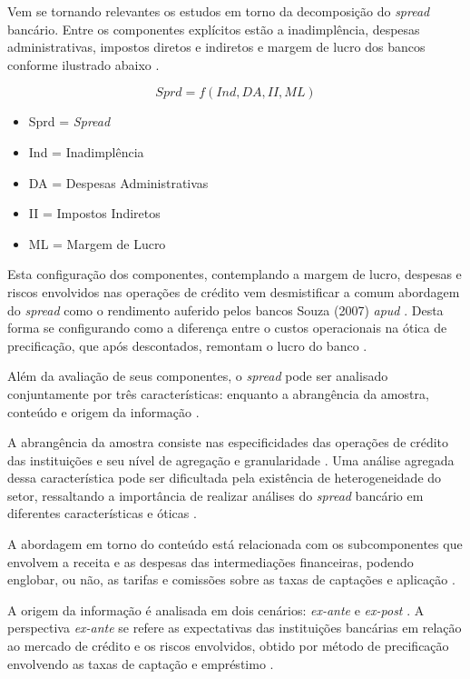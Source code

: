 \documentclass[12pt,openright,oneside,a4paper,chapter=TITLE,section=TITLE,subsection=Title,english,french,spanish,portugues,sumario=tradicional]{04-class-files/abntex2}
\providecommand{\tightlist}{%
  \setlength{\itemsep}{0pt}\setlength{\parskip}{0pt}}
\begin{document}
Vem se tornando relevantes os estudos em torno da decomposição do \emph{spread}
bancário. Entre os componentes explícitos estão a inadimplência, despesas administrativas, impostos diretos e indiretos e margem de lucro dos bancos conforme ilustrado abaixo \cite{BCB:2000}.

\[
Sprd=f(Ind, DA, II, ML)
\]

\begin{itemize}
\tightlist
\item
  Sprd = \emph{Spread}
\item
  Ind = Inadimplência
\item
  DA = Despesas Administrativas
\item
  II = Impostos Indiretos
\item
  ML = Margem de Lucro
\end{itemize}

Esta configuração dos componentes, contemplando a margem de lucro, despesas e
riscos envolvidos nas operações de crédito vem desmistificar a comum abordagem
do \emph{spread} como o rendimento auferido pelos bancos \cite{costa;nakane:2004}
Souza (2007) \emph{apud} \cite{dantas:2012}. Desta forma se configurando como a
diferença entre o custos operacionais na ótica de precificação, que após
descontados, remontam o lucro do banco \cite{BCB:2016}.

Além da avaliação de seus componentes, o \emph{spread} pode ser analisado
conjuntamente por três características: enquanto a abrangência da amostra,
conteúdo e origem da informação \cite{leal:2006}.

A abrangência da amostra consiste nas especificidades das operações de crédito
das instituições e seu nível de agregação e granularidade
\cite{costa;nakane:2004}. Uma análise agregada dessa característica pode ser
dificultada pela existência de heterogeneidade do setor, ressaltando a
importância de realizar análises do \emph{spread} bancário em diferentes
características e óticas \cite{block:2000}.

A abordagem em torno do conteúdo está relacionada com os subcomponentes que
envolvem a receita e as despesas das intermediações financeiras, podendo
englobar, ou não, as tarifas e comissões sobre as taxas de captações e
aplicação \cite{block:2000}.

A origem da informação é analisada em dois cenários: \emph{ex-ante} e \emph{ex-post}
\cite{kunt:1999, levine:1997}. A perspectiva \emph{ex-ante} se refere as
expectativas das instituições bancárias em relação ao mercado de crédito e os
riscos envolvidos, obtido por método de precificação envolvendo as taxas de
captação e empréstimo \cite{durigan:2018, leal:2006, dantas:2012}.
\end{document}
